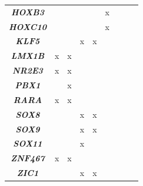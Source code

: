 \begin{table}[]
{\begin{tabular}{@{}|c|c|c|c|c|c|c|c|c|@{}}
\textit{\textbf{HOXB3}} &  &  &  &  & x \\
\textit{\textbf{HOXC10}} &  &  &  &  & x \\
\textit{\textbf{KLF5}} &  &  & x & x &  \\
\textit{\textbf{LMX1B}} & x & x &  &  &  \\
\textit{\textbf{NR2E3}} & x & x &  &  &  \\
\textit{\textbf{PBX1}} &  & x &  &  &  \\
\textit{\textbf{RARA}} & x & x &  &  &  \\
\textit{\textbf{SOX8}} &  &  & x & x &  \\
\textit{\textbf{SOX9}} &  &  & x & x &  \\
\textit{\textbf{SOX11}} &  &  & x &  &  \\
\textit{\textbf{ZNF467}} & x & x &  &  &  \\
\textit{\textbf{ZIC1}} &  &  & x & x &  \\  \hline 
\end{tabular}
}
\end{table}

